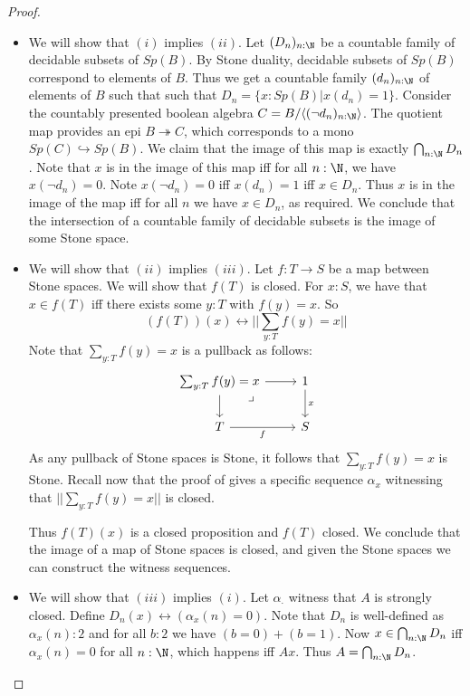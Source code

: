 \begin{proof}
  \begin{itemize}
    \item We will show that $(i)$ implies $(ii)$.
      Let $(D_n)_{n:\N}$ be a countable family of decidable subsets of $Sp(B)$. 
      By Stone duality, decidable subsets of $Sp(B)$ correspond to elements of $B$. 
      Thus we get a countable family $(d_n)_{n:\N}$ of elements of $B$ such that 
      such that $D_n = \{x:Sp(B)| x(d_n) = 1\}$. 
      Consider the countably presented boolean algebra 
      $C = B/\langle (\neg d_n)_{n:\N}\rangle$.
      The quotient map provides an epi $B\twoheadrightarrow C$, which 
      corresponds to a mono $Sp(C) \hookrightarrow Sp(B)$. 
      We claim that the image of this map is exactly $\bigcap_{n:\N} D_n$. 
      Note that $x$ is in the image of this map iff for all $n:\N$, we have 
      $x(\neg d_n) = 0$. Note $x(\neg d_n) = 0$ iff $x (d_n) = 1$ iff $x\in D_n$. 
      Thus $x$ is in the image of the map iff for all $n$ we have $x\in D_n$,
      as required. 
      We conclude that the intersection of a countable family of decidable subsets 
      is the image of some Stone space. 
    \item We will show that $(ii)$ implies $(iii)$.
    Let $f:T\to S$ be a map between Stone spaces. 
    We will show that $f(T)$ is closed. 
    For $x:S$, we have that $x\in f(T)$ iff there exists some $y:T$ 
    with $f(y) = x$. 
    So 
    \begin{equation}
      (f(T))(x) \leftrightarrow || \sum_{y:T} f(y) = x||
    \end{equation}
    Note that $\sum_{y:T} f(y) = x$ is a pullback as follows:
    \begin{equation}
      \begin{tikzcd}
        \sum_{y:T} f(y) = x\arrow[rd,"\lrcorner"{pos=0.125},phantom] \arrow[r] \arrow[d]
        & 1 \arrow[d,"x"] \\
        T \arrow[r,"f"']  & S
      \end{tikzcd}
    \end{equation}
    As any pullback of Stone spaces is Stone, it follows that 
    $\sum_{y:T} f(y) = x$ is Stone.
    Recall now that the proof of  
    gives a specific sequence $\alpha_x$ witnessing that $||\sum_{y:T} f(y) = x||$ is closed. 

    Thus $f(T)(x)$ is a closed proposition and $f(T)$ closed. 
    We conclude that the image of a map of Stone spaces is closed, 
    and given the Stone spaces we can construct the witness sequences. 
  \item We will show that $(iii)$ implies $(i)$. 
    Let $\alpha_{\cdot}$ witness that $A$ is strongly closed. Define 
    $D_n(x) \leftrightarrow (\alpha_x(n) = 0)$. 
    Note that $D_n$ is well-defined as $\alpha_x(n):2$ and for all $b:2$ we have
    $(b=0)+ (b=1)$. Now $x \in \bigcap_{n:\N} D_n$ iff
    $\alpha_x(n) = 0$ for all $n:\N$, 
    which happens iff $A x$. Thus $A = \bigcap_{n:\N} D_n$. 
\end{itemize} 
\end{proof} 
